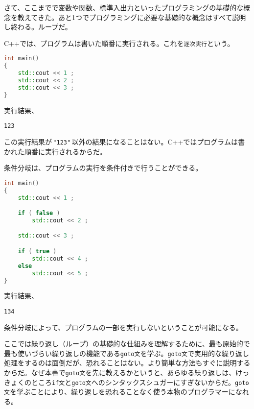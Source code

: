 
さて、ここまでで変数や関数、標準入出力といったプログラミングの基礎的な概念を教えてきた。あと1つでプログラミングに必要な基礎的な概念はすべて説明し終わる。ループだ。


C++では、プログラムは書いた順番に実行される。これを\texttt{逐次実行}という。

\begin{lstlisting}[language={C++}]
int main()
{
    std::cout << 1 ;
    std::cout << 2 ;
    std::cout << 3 ;
}
\end{lstlisting}

実行結果、

\begin{lstlisting}[style=terminal]
123
\end{lstlisting}

この実行結果が\,\texttt{"123"}\,以外の結果になることはない。C++ではプログラムは書かれた順番に実行されるからだ。

条件分岐は、プログラムの実行を条件付きで行うことができる。

\begin{lstlisting}[language={C++}]
int main()
{
    std::cout << 1 ;

    if ( false )
        std::cout << 2 ;

    std::cout << 3 ;

    if ( true )
        std::cout << 4 ;
    else
        std::cout << 5 ;
}
\end{lstlisting}

実行結果、

\begin{lstlisting}[style=terminal]
134
\end{lstlisting}

条件分岐によって、プログラムの一部を実行しないということが可能になる。


ここでは繰り返し（ループ）の基礎的な仕組みを理解するために、最も原始的で最も使いづらい繰り返しの機能である\texttt{goto文}を学ぶ。\texttt{goto文}で実用的な繰り返し処理をするのは面倒だが、恐れることはない。より簡単な方法もすぐに説明するからだ。なぜ本書で\texttt{goto文}を先に教えるかというと、あらゆる繰り返しは、けっきょくのところ\texttt{if文}と\texttt{goto文}へのシンタックスシュガーにすぎないからだ。\texttt{goto文}を学ぶことにより、繰り返しを恐れることなく使う本物のプログラマーになれる。

